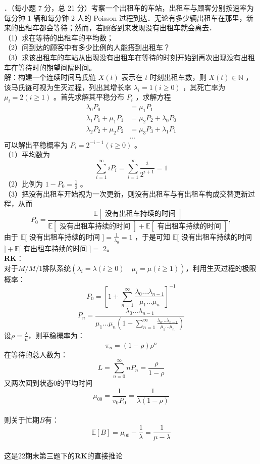 \documentclass[UTF8]{ctexart}
\begin{document}
．（每小题 7 分，总 21 分）考察一个出租车的车站，出租车与顾客分别按速率为每分钟 1 辆和每分钟 2 人的 Poisson 过程到达．无论有多少辆出租车在那里，新来的出租车都会等待；然而，若顾客到来发现没有出租车就会离去．\\
（1）求在等待的出租车的平均数；\\
（2）问到达的顾客中有多少比例的人能搭到出租车？\\
（3）求该出租车的车站从出现没有出租车在等待的时刻开始到再次出现没有出租车在等待时的期望间隔时间。\\
解：构建一个连续时间马氏链 $X(t)$ 表示在 $t$ 时刻出租车数，则 $X(t) \in \mathbb{N}$ ，该马氏链可视为生灭过程，列出其增长率 $\lambda_i=1(i \geq 0)$ ，其死亡率为 $\mu_i=2(i \geq 1)$ 。首先求解其平稳分布 $P_i$ ，求解方程\\
$$
\begin{aligned}
	\lambda_0 P_0 & =\mu_1 P_1 \\
	\lambda_1 P_1+\mu_1 P_1 & =\mu_2 P_2+\lambda_0 P_0 \\
	\lambda_2 P_2+\mu_2 P_2 & =\mu_3 P_3+\lambda_1 P_1 \\
	& \ldots
\end{aligned}
$$
可以解出平稳概率为 $P_i=2^{-i-1}(i \geq 0)$ 。\\
（1）平均数为
$$
\sum_{i=1}^{\infty} i P_i=\sum_{i=1}^{\infty} \frac{i}{2^{i+1}}=1
$$
（2）比例为 $1-P_0=\frac{1}{2}$ 。\\
（3）把没有出租车开始视为一次更新，则没有出租车与有出租车构成交替更新过程，从而
$$
P_0=\frac{\mathbb{E}[\text { 没有出租车持续的时间 }]}{\mathbb{E}[\text { 没有出租车持续的时间 }]+\mathbb{E}[\text { 有出租车持续的时间 }]},
$$
由于 $\mathbb{E}[$ 没有出租车持续的时间 $]=\frac{1}{\lambda_0}=1$ ，于是可知 $\mathbb{E}[$ 没有出租车持续的时间 $]+\mathbb{E}[$ 有出租车持续的时间 $]=$ 2。\\
\textbf{RK}：\\
对于$M/ M / 1$排队系统$(\lambda_i=\lambda(i \geq 0)\quad \mu_i=\mu(i \geq 1))$，利用生灭过程的极限概率：
\[
P_0=\left[1+\sum\limits_{n=1}^{\infty} \frac{\lambda_0 \dots \lambda_{n-1}}{\mu_1 \dots \mu_n} \right] ^{-1}
\]
\[
P_n=\frac{\lambda_0 \dots \lambda_{n-1}}{\mu_1 \dots \mu_n\left(1+\sum\limits_{n=1}^{\infty} \frac{\lambda_0 \dots \lambda_{n-1}}{\mu_1 \dots \mu_n} \right) }
\]
设$\rho=\frac{\lambda}{\mu}$，则平稳概率为：
\[
\pi_n=(1-\rho)\rho^n
\]
在等待的总人数为：
\[
L=\sum\limits_{n=0}^{\infty} nP_n=\frac{\rho}{1-\rho}
\]
又两次回到状态0的平均时间$$\mu_{00}=\frac{1}{v_0P_0}=\frac{1}{\lambda(1-\rho)}$$\\
则关于忙期$B$有：
\[
\mathbb{E}[B]=\mu_{00}-\frac{1}{\lambda}=\frac{1}{\mu-\lambda}
\]\\
这是22期末第三题下的\textbf{RK}的直接推论\\
\end{document}
